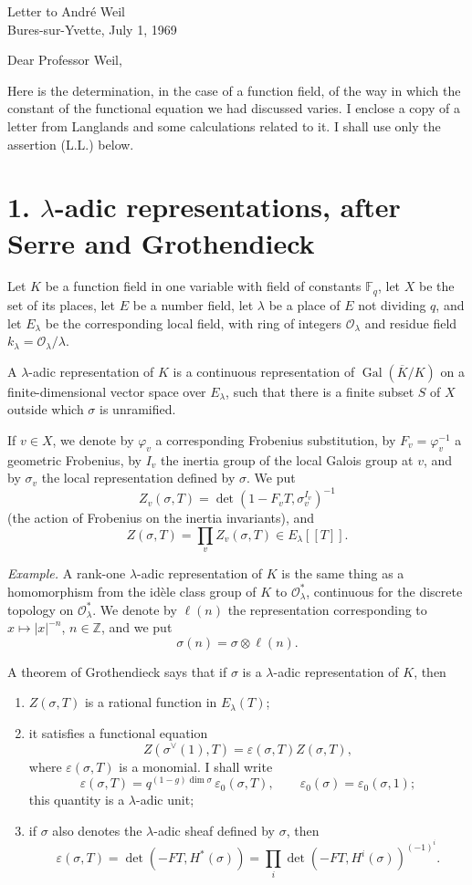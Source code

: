 \documentclass[11pt]{article}
\newcommand{\Gal}{\operatorname{Gal}}
\newcommand{\cO}{\mathcal{O}}
\newcommand{\Fq}{\mathbb{F}_q}
\newcommand{\Z}{\mathbb{Z}}
\newcommand{\eps}{\varepsilon}
\begin{document}
\begin{center}
{\large Letter to André Weil}\\
Bures-sur-Yvette, July 1, 1969
\end{center}

Dear Professor Weil,

Here is the determination, in the case of a function field, of the way in which the constant of the functional equation we had discussed varies. I enclose a copy of a letter from Langlands and some calculations related to it. I shall use only the assertion (L.L.) below.

\section*{1. \(\lambda\)-adic representations, after Serre and Grothendieck}

Let \(K\) be a function field in one variable with field of constants \(\Fq\), let \(X\) be the set of its places, let \(E\) be a number field, let \(\lambda\) be a place of \(E\) not dividing \(q\), and let \(E_\lambda\) be the corresponding local field, with ring of integers \(\cO_\lambda\) and residue field \(k_\lambda=\cO_\lambda/\lambda\).

A \(\lambda\)-adic representation of \(K\) is a continuous representation of \(\Gal(\overline K/K)\) on a finite-dimensional vector space over \(E_\lambda\), such that there is a finite subset \(S\) of \(X\) outside which \(\sigma\) is unramified.

If \(v\in X\), we denote by \(\varphi_v\) a corresponding Frobenius substitution, by \(F_v=\varphi_v^{-1}\) a geometric Frobenius, by \(I_v\) the inertia group of the local Galois group at \(v\), and by \(\sigma_v\) the local representation defined by \(\sigma\). We put
\[
Z_v(\sigma,T)=\det(1-F_vT,\sigma_v^{I_v})^{-1}
\]
(the action of Frobenius on the inertia invariants), and
\[
Z(\sigma,T)=\prod_v Z_v(\sigma,T)\in E_\lambda[[T]].
\]

\emph{Example.} A rank-one \(\lambda\)-adic representation of \(K\) is the same thing as a homomorphism from the idèle class group of \(K\) to \(\cO_\lambda^\ast\), continuous for the discrete topology on \(\cO_\lambda^\ast\). We denote by \(\ell(n)\) the representation corresponding to \(x\mapsto |x|^{-n}\), \(n\in\Z\), and we put
\[
\sigma(n)=\sigma\otimes\ell(n).
\]

A theorem of Grothendieck says that if \(\sigma\) is a \(\lambda\)-adic representation of \(K\), then
\begin{enumerate}[label=\alph*)]
\item \(Z(\sigma,T)\) is a rational function in \(E_\lambda(T)\);
\item it satisfies a functional equation
\[
Z(\sigma^\vee(1),T)=\eps(\sigma,T)Z(\sigma,T),
\]
where \(\eps(\sigma,T)\) is a monomial. I shall write
\[
\eps(\sigma,T)=q^{(1-g)\dim\sigma}\,\eps_0(\sigma,T),\qquad
\eps_0(\sigma)=\eps_0(\sigma,1);
\]
this quantity is a \(\lambda\)-adic unit;
\item if \(\sigma\) also denotes the \(\lambda\)-adic sheaf defined by \(\sigma\), then
\[
\eps(\sigma,T)=\det(-FT,H^\ast(\sigma))
=\prod_i\det(-FT,H^i(\sigma))^{(-1)^i}.
\]
\end{enumerate}
\end{document}
